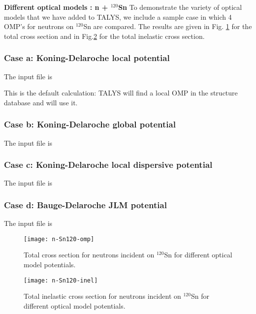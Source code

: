 \begin{samplecase}
{\bf Different optical models : n + ${}^{120}$Sn}\newline
To demonstrate the variety of optical models that we have added to 
TALYS, we include a sample case in which 4 OMP's for neutrons on 
$^{120}$Sn are compared. The results are given in Fig. \ref{sntotal} for
the total cross section and in Fig.\ref{sninl} for the total inelastic cross 
section.
\subsubsection{Case a: Koning-Delaroche local potential}
The input file is


This is the default calculation: TALYS will find a local OMP in the 
structure database and will use it.
\subsubsection{Case b: Koning-Delaroche global potential}
The input file is


\subsubsection{Case c: Koning-Delaroche local dispersive potential}
The input file is


\subsubsection{Case d: Bauge-Delaroche JLM potential}
The input file is


\end{samplecase}
\begin{figure}
\centering\texttt{[image: n-Sn120-omp]}
\caption{Total cross section for neutrons incident on $^{120}$Sn for
different optical model potentials.}
\label{sntotal}
\end{figure}
\begin{figure}
\centering\texttt{[image: n-Sn120-inel]}
\caption{Total inelastic cross section for neutrons incident on $^{120}$Sn for
different optical model potentials.}
\label{sninl}
\end{figure}
